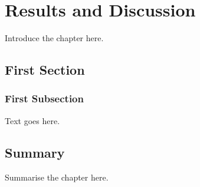 
\chapter{Results and Discussion}

Introduce the chapter here.

\section{First Section}

\subsection{First Subsection}
Text goes here.

\section{Summary}
Summarise the chapter here.


\newpage
